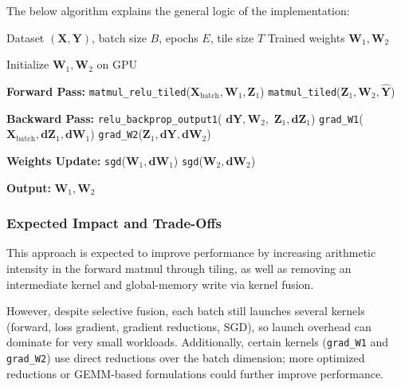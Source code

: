 \documentclass[conference, 12pt]{IEEEtran}
\begin{document}
The below algorithm explains the general logic of the implementation:

\begin{algorithm}
\caption{GPU-Resident Training with Tiling and Kernel Fusion}
\label{alg:gpu_nn_training_fusion}
\begin{algorithmic}[0]  %
\Require Dataset $(\mathbf{X}, \mathbf{Y})$, batch size $B$, epochs $E$, tile size $T$
\Ensure Trained weights $\mathbf{W}_1, \mathbf{W}_2$

\State Initialize $\mathbf{W}_1, \mathbf{W}_2$ on GPU

    
        \State \textbf{Forward Pass:}
        \State \texttt{matmul\_relu\_tiled}($\mathbf{X}_\text{batch}, \mathbf{W}_1, \mathbf{Z}_1$)  
        \State \texttt{matmul\_tiled}($\mathbf{Z}_1, \mathbf{W}_2, \hat{\mathbf{Y}}$)  

        \State \textbf{Backward Pass:}
    \State \texttt{relu\_backprop\_output1}(
            $\mathbf{dY}, \mathbf{W}_2,$ \newline 
            $\mathbf{Z}_1, \mathbf{dZ}_1$)
        \State \texttt{grad\_W1}($\mathbf{X}_\text{batch}, \mathbf{dZ}_1, \mathbf{dW}_1$)
        \State \texttt{grad\_W2}($\mathbf{Z}_1, \mathbf{dY}, \mathbf{dW}_2$)

        \State \textbf{Weights Update:}
        \State \texttt{sgd}($\mathbf{W}_1, \mathbf{dW}_1$)
        \State \texttt{sgd}($\mathbf{W}_2, \mathbf{dW}_2$)

    \EndFor
\EndFor

\State \textbf{Output:} $\mathbf{W}_1, \mathbf{W}_2$
\end{algorithmic}
\end{algorithm}



\subsubsection{Expected Impact and Trade-Offs}
This approach is expected to improve performance by increasing arithmetic intensity in the forward matmul through tiling, as well as removing an intermediate kernel and global-memory write via kernel fusion.

However, despite selective fusion, each batch still launches several kernels (forward, loss gradient, gradient reductions, SGD), so launch overhead can dominate for very small workloads. Additionally, certain kernels (\texttt{grad\_W1} and \texttt{grad\_W2}) use direct reductions over the batch dimension; more optimized reductions or GEMM-based formulations could further improve performance.
\end{document}
